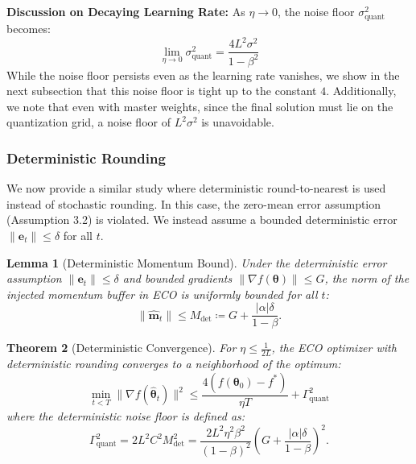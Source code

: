 \documentclass[11pt, a4paper, onecolumn, copyright, goog]{google}
\newcommand{\methodname}{ECO}
\newcommand{\vect}[1]{\mathbf{#1}}
\newcommand{\vtheta}{\boldsymbol{\theta}}
\newcommand{\vm}{\vect{m}}
\newcommand{\ve}{\vect{e}}
\theoremstyle{plain}
\newtheorem{theorem}{Theorem}[section]
\newtheorem{lemma}[theorem]{Lemma}
\theoremstyle{definition}
\theoremstyle{remark}
\begin{document}
\noindent \textbf{Discussion on Decaying Learning Rate:} As $\eta \to 0$, the noise floor $\sigma_{\text{quant}}^2$ becomes:
\begin{equation}
    \lim_{\eta \to 0} \sigma_{\text{quant}}^2 = \frac{4L^2 \sigma^2}{1-\beta^2} \label{eq:noise-floor}
\end{equation}
While the noise floor persists even as the learning rate vanishes, we show in the next subsection that this noise floor is tight up to the constant $4$. Additionally, we note that even with master weights, since the final solution must lie on the quantization grid, a noise floor of $L^2 \sigma^2$ is unavoidable.

\subsubsection{Deterministic Rounding}
We now provide a similar study where deterministic round-to-nearest is used instead of stochastic rounding. In this case, the zero-mean error assumption (Assumption 3.2) is violated. We instead assume a bounded deterministic error $\|\ve_t\| \le \delta$ for all $t$.

\begin{lemma}[Deterministic Momentum Bound]
\label{lemma:momentum_bound_det}
Under the deterministic error assumption $\|\ve_t\| \le \delta$ and bounded gradients $\|\nabla f(\vtheta)\| \le G$, the norm of the injected momentum buffer in \methodname{} is uniformly bounded for all $t$:
\begin{equation}
    \|\hat{\vm}_t\| \le M_{\text{det}} \coloneqq G + \frac{|\alpha| \delta}{1-\beta}.
\end{equation}
\end{lemma}

\begin{theorem}[Deterministic Convergence]
\label{thm:convergence_det}
For $\eta \le \frac{1}{2L}$, the \methodname{} optimizer with deterministic rounding converges to a neighborhood of the optimum:
\begin{equation}
    \min_{t < T} \|\nabla f(\hat{\vtheta}_t)\|^2 \le \frac{4(f(\vtheta_0) - f^*)}{\eta T} + \Gamma_{\text{quant}}^2
\end{equation}
where the deterministic noise floor is defined as:
\begin{equation}
    \Gamma_{\text{quant}}^2 = 2L^2 C^2 M_{\text{det}}^2 = \frac{2L^2 \eta^2 \beta^2}{(1-\beta)^2} \left( G + \frac{|\alpha|\delta}{1-\beta} \right)^2.
\end{equation}
\end{theorem}
\end{document}
